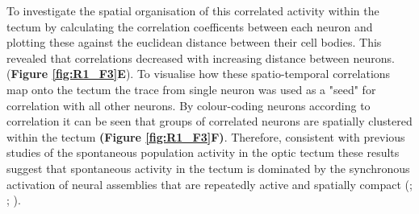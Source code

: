 To investigate the spatial organisation of this correlated activity within the tectum by calculating the correlation coefficents between each neuron and plotting these against the euclidean distance between their cell bodies.  This revealed that correlations decreased with increasing distance between neurons. (\textbf{Figure \ref{fig:R1_F3}E}). To visualise how these spatio-temporal correlations map onto the tectum the trace from single neuron was used as a "seed" for correlation with all other neurons. By colour-coding neurons according to correlation it can be seen that groups of correlated neurons are spatially clustered within the tectum \textbf{(Figure \ref{fig:R1_F3}F)}. Therefore, consistent with previous studies of the spontaneous population activity in the optic tectum these results suggest that spontaneous activity in the tectum is dominated by the synchronous activation of neural assemblies that are repeatedly active and spatially compact (\cite{Romano2015}; \cite{Avitan2017}; \cite{Pietri2017}).

